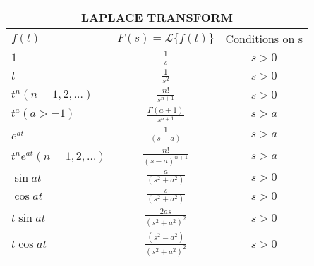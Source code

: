 \documentclass[a4paper]{article}
\begin{document}
\begin{center}
	\renewcommand{\arraystretch}{1.6}
	\renewcommand{\tabcolsep}{8mm}
	\begin{tabular}{llcccc}
		\multicolumn{6}{c}{LAPLACE TRANSFORM} \\
		\hline 
		\multicolumn{2}{l}{$f(t)$} &  \multicolumn{2}{c}{$F(s) = \mathcal{L}\{f(t)\}$} & \multicolumn{2}{c}{Conditions on s} \\ 
		\hline
		
 		\multicolumn{2}{l}{$\displaystyle1$} & \multicolumn{2}{c}{$\displaystyle \frac{1}{s}$} & \multicolumn{2}{c}{$s > 0$} \\
		
		\multicolumn{2}{l}{$\displaystyle t$} & \multicolumn{2}{c}{$\displaystyle \frac{1}{s^2}$} & \multicolumn{2}{c}{$s > 0$} \\

		\multicolumn{2}{l}{$\displaystyle t^n (n=1,2,\ldots)$} & \multicolumn{2}{c}{$\displaystyle \frac{n!}{s^{n+1}}$} & \multicolumn{2}{c}{$s > 0$} \\


		\multicolumn{2}{l}{$\displaystyle t^a (a > -1)$} & \multicolumn{2}{c}{$\displaystyle \frac{\Gamma(a+1)}{s^{a+1}}$} & \multicolumn{2}{c}{$s > a$} \\



		\multicolumn{2}{l}{$\displaystyle e^{at}$} & \multicolumn{2}{c}{$\displaystyle \frac{1}{(s-a)}$} & \multicolumn{2}{c}{$s > a$} \\

		\multicolumn{2}{l}{$\displaystyle t^n e^{at} (n= 1, 2,\ldots)$} & \multicolumn{2}{c}{$\displaystyle \frac{n!}{(s-a)^{n+1}}$} & \multicolumn{2}{c}{$s > a$} \\


		\multicolumn{2}{l}{$\displaystyle \sin at$} & \multicolumn{2}{c}{$\displaystyle \frac{a}{(s^2 + a^2)}$} & \multicolumn{2}{c}{$s > 0$} \\

		\multicolumn{2}{l}{$\displaystyle \cos at$} & \multicolumn{2}{c}{$\displaystyle \frac{s}{(s^2 + a^2)}$} & \multicolumn{2}{c}{$s > 0$} \\


		\multicolumn{2}{l}{$\displaystyle t \sin at$} & \multicolumn{2}{c}{$\displaystyle \frac{2as}{(s^2 + a^2)^2}$} & \multicolumn{2}{c}{$s > 0$} \\

		\multicolumn{2}{l}{$\displaystyle t \cos at$} & \multicolumn{2}{c}{$\displaystyle \frac{(s^2 - a^2)}{(s^2 + a^2)^2}$} & \multicolumn{2}{c}{$s > 0$} \\



\end{tabular}
\end{center}
\end{document}
